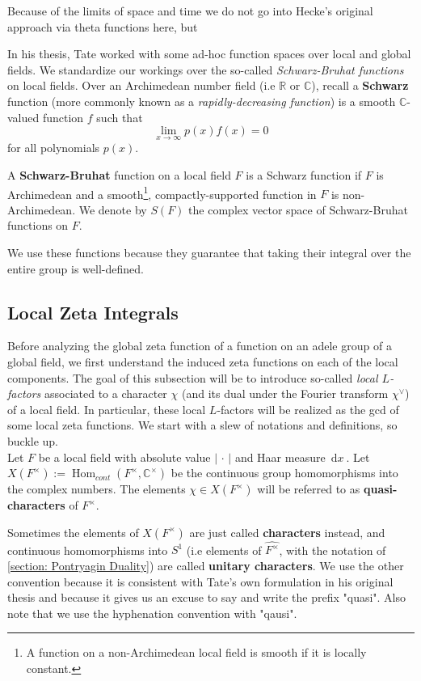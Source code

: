 \documentclass[11pt, x11names, openany]{book}
\newcommand{\rr}{\mathbb{R}}
\newcommand{\cc}{\mathbb{C}}
\newcommand{\abs}[1]{\left| \, #1  \,\right|}
\renewcommand{\hat}{\widehat}
\DeclareMathOperator{\Hom}{Hom}
\newcommand{\dx}{\, \mathrm{d}x \ }
\begin{document}
Because of the limits of space and time we do not go into Hecke's original approach via theta functions here, but 

In his thesis, Tate worked with some ad-hoc function spaces over local and global fields. We standardize our workings over the so-called \textit{Schwarz-Bruhat functions} on local fields. Over an Archimedean number field (i.e $\rr$ or $\cc$), recall a \textbf{Schwarz} function (more commonly known as a \textit{rapidly-decreasing function}) is a smooth $\cc$-valued function $f$ such that
\begin{equation*}
    \lim_{x \to \infty} p(x)f(x) = 0
\end{equation*}
for all polynomials $p(x)$.
\begin{defn}
\label{def: Schwarz-Bruhat functions}
A \textbf{Schwarz-Bruhat} function on a local field $F$ is a Schwarz function if $F$ is Archimedean and a smooth\footnote{A function on a non-Archimedean local field is smooth if it is locally constant.}, compactly-supported function in $F$ is non-Archimedean. We denote by $S(F)$ the complex vector space of Schwarz-Bruhat functions on $F$.
\end{defn}
We use these functions because they guarantee that taking their integral over the entire group is well-defined.

\subsection{Local Zeta Integrals}
Before analyzing the global zeta function of a function on an adele group of a global field, we first understand the induced zeta functions on each of the local components. The goal of this subsection will be to introduce so-called \textit{local $L$-factors} associated to a character $\chi$ (and its dual under the Fourier transform $\chi^\lor$) of a local field. In particular, these local $L$-factors will be realized as the gcd of some local zeta functions. We start with a slew of notations and definitions, so buckle up.\\

Let $F$ be a local field with absolute value $\abs{\cdot}$ and Haar measure $\dx$.
Let $X(F^\times) := \Hom_{cont}(F^\times, \cc^\times)$ be the continuous group homomorphisms into the complex numbers. The elements $\chi \in X(F^\times)$ will be referred to as \textbf{quasi-characters} of $F^\times$.
\begin{remark}
    Sometimes the elements of $X(F^\times)$ are just called \textbf{characters} instead, and continuous homomorphisms into $S^1$ (i.e elements of $\hat{F^\times}$, with the notation of \ref{section: Pontryagin Duality}) are called \textbf{unitary characters}. We use the other convention because it is consistent with Tate's own formulation in his original thesis and because it gives us an excuse to say and write the prefix "quasi". Also note that we use the hyphenation convention with "qausi".
\end{remark}
\end{document}

